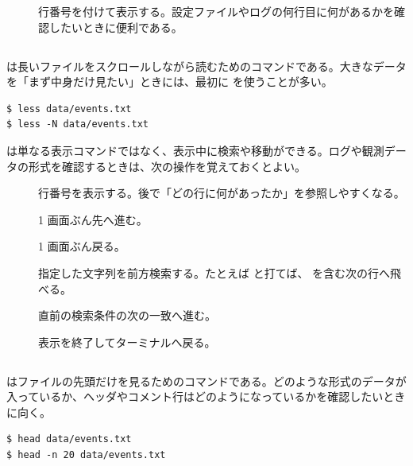 \begin{description}
\item[] 行番号を付けて表示する。設定ファイルやログの何行目に何があるかを確認したいときに便利である。
\end{description}

\subsection{}

 は長いファイルをスクロールしながら読むためのコマンドである。大きなデータを「まず中身だけ見たい」ときには、最初に  を使うことが多い。

\begin{lstlisting}[numbers=none, xleftmargin=2\zw]
$ less data/events.txt
$ less -N data/events.txt
\end{lstlisting}

 は単なる表示コマンドではなく、表示中に検索や移動ができる。ログや観測データの形式を確認するときは、次の操作を覚えておくとよい。

\begin{description}
\item[] 行番号を表示する。後で「どの行に何があったか」を参照しやすくなる。
\item[] 1 画面ぶん先へ進む。
\item[] 1 画面ぶん戻る。
\item[] 指定した文字列を前方検索する。たとえば  と打てば、 を含む次の行へ飛べる。
\item[] 直前の検索条件の次の一致へ進む。
\item[] 表示を終了してターミナルへ戻る。
\end{description}

\subsection{}

 はファイルの先頭だけを見るためのコマンドである。どのような形式のデータが入っているか、ヘッダやコメント行はどのようになっているかを確認したいときに向く。

\begin{lstlisting}[numbers=none, xleftmargin=2\zw]
$ head data/events.txt
$ head -n 20 data/events.txt
\end{lstlisting}

